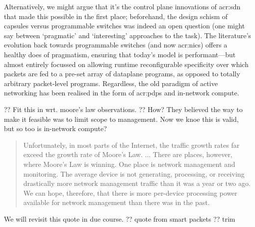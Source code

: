 Alternatively, we might argue that it's the control plane innovations of \gls{acr:sdn} that made this possible in the first place; beforehand, the design schism of capsules versus programmable switches was indeed an open question (one might say between `pragmatic' and `interesting' approaches to the task).
The literature's evolution back towards programmable switches (and now \glspl{acr:nic}) offers a healthy does of pragmatism, ensuring that today's model is performant---but almost entirely focussed on allowing runtime reconfigurable specificity over which packets are fed to a pre-set array of dataplane programs, as opposed to totally arbitrary packet-level programs.
Regardless, the old paradigm of active networking has been realised in the form of \glspl{acr:pdp} and in-network compute.

?? Fit this in wrt. moore's law observations.
?? How? They believed the way to make it feasible was to limit scope to management. Now we knoe this is valid, but so too is in-network compute?
\begin{quotation}
	\noindent
	Unfortunately, in most parts of the Internet, the traffic growth rates far exceed the growth rate of Moore’s Law. ...
	There are places, however, where Moore’s Law is winning.
	One place is network management and monitoring.
	The average device is not generating, processing, or receiving drastically more network management traffic than it was a year or two ago.
	We can hope, therefore, that there is more per-device processing power available for network management than there was in the past.
	\strut\hfill\parencite[p. 68]{DBLP:journals/tocs/SchwartzJSZRP00}
\end{quotation}
We will revisit this quote in due course. ?? quote from smart packets ?? trim

